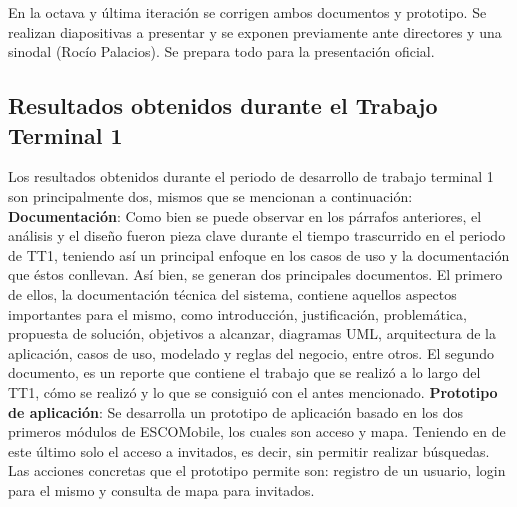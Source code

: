 \noindent
En la octava y última iteración se corrigen ambos documentos y prototipo. Se realizan diapositivas a presentar y se exponen previamente ante directores y una sinodal (Rocío Palacios). Se prepara todo para la presentación oficial.

\subsection{Resultados obtenidos durante el Trabajo Terminal 1}

\noindent
Los resultados obtenidos durante el periodo de desarrollo de trabajo terminal 1 son principalmente dos, mismos que se mencionan a continuación:
\newline
\newline
\textbf{Documentación}: Como bien se puede observar en los párrafos anteriores, el análisis y el diseño fueron pieza clave durante el tiempo trascurrido en el periodo de TT1, teniendo así un principal enfoque en los casos de uso y la documentación que éstos conllevan. Así bien, se generan dos principales documentos. El primero de ellos, la documentación técnica del sistema, contiene aquellos aspectos importantes para el mismo, como introducción, justificación, problemática, propuesta de solución, objetivos a alcanzar, diagramas UML, arquitectura de la aplicación, casos de uso, modelado y reglas del negocio, entre otros. El segundo documento, es un reporte que contiene el trabajo que se realizó a lo largo del TT1, cómo se realizó y lo que se consiguió con el antes mencionado. 
\newline
\newline
\textbf{Prototipo de aplicación}: Se desarrolla un prototipo de aplicación basado en los dos primeros módulos de ESCOMobile, los cuales son acceso y mapa. Teniendo en de este último solo el acceso a invitados, es decir, sin permitir realizar búsquedas. Las acciones concretas que el prototipo permite son: registro de un usuario, login para el mismo y consulta de mapa para invitados.